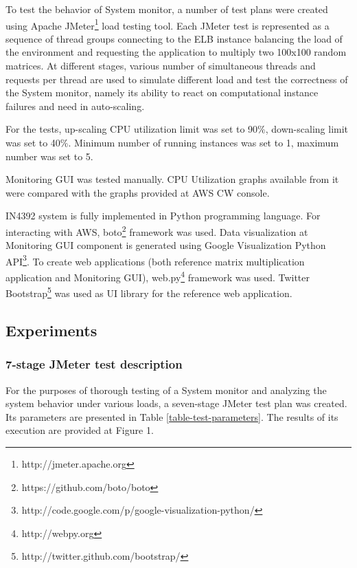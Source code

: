 \documentclass[conference]{IEEEtran}
\begin{document}
To test the behavior of System monitor, a number of test plans were created using Apache JMeter\footnote{http://jmeter.apache.org} load testing tool. Each JMeter test is represented as a sequence of thread groups connecting to the ELB instance balancing the load of the environment and requesting the application to multiply two 100x100 random matrices. At different stages, various number of simultaneous threads and requests per thread are used to simulate different load and test the correctness of the System monitor, namely its ability to react on computational instance failures and need in auto-scaling.

For the tests, up-scaling CPU utilization limit was set to 90\%, down-scaling limit was set to 40\%. Minimum number of running instances was set to 1, maximum number was set to 5.

Monitoring GUI was tested manually. CPU Utilization graphs available from it were compared with the graphs provided at AWS CW console.

IN4392 system is fully implemented in Python programming language. For interacting with AWS, boto\footnote{https://github.com/boto/boto} framework was used. Data visualization at Monitoring GUI component is generated using Google Visualization Python API\footnote{http://code.google.com/p/google-visualization-python/}. To create web applications (both reference matrix multiplication application and Monitoring GUI), web.py\footnote{http://webpy.org} framework was used. Twitter Bootstrap\footnote{http://twitter.github.com/bootstrap/} was used as UI library for the reference web application.

\subsection{Experiments}

\subsubsection{7-stage JMeter test description}

For the purposes of thorough testing of a System monitor and analyzing the system behavior under various loads, a seven-stage JMeter test plan was created. Its parameters are presented in Table \ref{table-test-parameters}. The results of its execution are provided at Figure 1.
\end{document}
